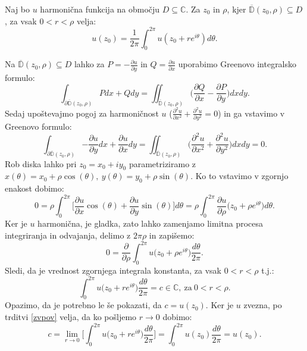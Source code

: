 \documentclass[mat1]{fmfdelo}
\newcommand{\C}{\mathbb C}
\begin{document}
    \begin{trditev}
        \label{harmonicnapovp}
        Naj bo $u$ harmonična funkcija na območju $D \subseteq \C$. Za $z_0$ in $\rho$, kjer $\overline{\mathbb{D}}(z_0, \rho) \subseteq D$, za vsak $0 < r < \rho$ velja:
            $$
                u(z_0) = \frac{1}{2 \pi} \int_{0}^{2 \pi}{u(z_0 + r e^{i \theta}) d\theta}.
            $$
    \end{trditev}
    \begin{dokaz}
        Na $\overline{\mathbb{D}}(z_0, \rho) \subseteq D$ lahko za $P = -\frac{\partial u}{\partial y}$ in $Q = \frac{\partial u}{\partial x}$ uporabimo Greenovo integralsko formulo:
        $$
            \int_{\partial \overline{\mathbb{D}}(z_0, \rho)}{P dx + Q dy} = \iint_{\overline{\mathbb{D}}(z_0, \rho)}{\bigg(\frac{\partial Q}{\partial x} - \frac{\partial P}{\partial y}\bigg)dx dy}.
        $$ 
        Sedaj upoštevajmo pogoj za harmoničnost $u$ \big($\frac{\partial^2 u}{\partial x^2} + \frac{\partial^2 u}{\partial y^2} = 0$\big) in ga vstavimo v Greenovo formulo:
        $$
        \int_{\partial \overline{\mathbb{D}}(z_0, \rho)}{-\frac{\partial u}{\partial y} dx + \frac{\partial u}{\partial x} dy} = \iint_{\overline{\mathbb{D}}(z_0, \rho)}{\bigg(\frac{\partial^2 u}{\partial x^2} + \frac{\partial^2 u}{\partial y^2}\bigg)dx dy} = 0. 
        $$
        Rob diska lahko pri $z_0 = x_0 + iy_0$ parametriziramo z $x(\theta) = x_0 + \rho \cos(\theta),~y(\theta) = y_0 + \rho \sin(\theta)$. Ko to vstavimo v zgornjo enakost dobimo:
        $$
        0 = \rho \int_{0}^{2 \pi}{\bigg[\frac{\partial u}{\partial x} \cos(\theta) + \frac{\partial u}{\partial y} \sin(\theta)\bigg] d\theta} = \rho \int_{0}^{2\pi}{\frac{\partial u}{\partial \rho}\big({z_0 + \rho e^{i\theta}\big)d\theta}}.
        $$
        Ker je $u$ harmonična, je gladka, zato lahko zamenjamo limitna procesa integriranja in odvajanja, delimo z $2\pi \rho$ in zapišemo:
        $$
        0 = \frac{\partial}{\partial \rho} \int_{0}^{2\pi}{u\big({z_0 + \rho e^{i\theta}\big)\frac{d\theta}{2 \pi}}}.
        $$
        Sledi, da je vrednost zgornjega integrala konstanta, za vsak $0 <r < \rho$ t.j.: 
        $$
        \int_{0}^{2\pi}{u\big({z_0 + r e^{i\theta}\big)\frac{d\theta}{2 \pi}}} = c \in \mathbb{C},~\text{za}~ 0 < r < \rho.
        $$
        Opazimo, da je potrebno le še pokazati, da $c = u(z_0)$.
        Ker je $u$ zvezna, po trditvi \ref{zvpov} velja, da ko pošljemo $r \to 0$ dobimo:
        $$
        c = \lim_{r \to 0}{\bigg[\int_{0}^{2\pi}{u\big({z_0 + r e^{i\theta}\big)\frac{d\theta}{2 \pi}}}\bigg]} = \int_{0}^{2\pi}{{u(z_0)\frac{d\theta}{2 \pi}}} = u(z_0).
        $$
    \end{dokaz}
\end{document}
